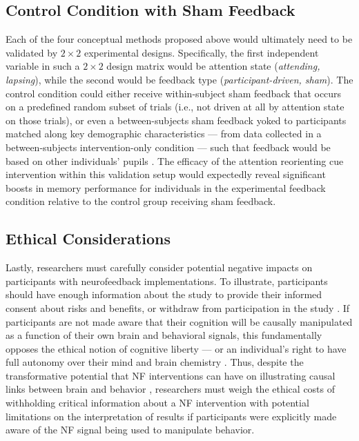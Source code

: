 \subsection{Control Condition with Sham Feedback}

Each of the four conceptual methods proposed above would ultimately need to be validated by $2 \times 2$ experimental designs. Specifically, the first independent variable in such a $2 \times 2$ design matrix would be attention state (\emph{attending, lapsing}), while the second would be feedback type (\emph{participant-driven, sham}). The control condition could either receive within-subject sham feedback that occurs on a predefined random subset of trials (i.e., not driven at all by attention state on those trials), or even a between-subjects sham feedback yoked to participants matched along key demographic characteristics --- from data collected in a between-subjects intervention-only condition --- such that feedback would be based on other individuals' pupils \parencite[similar to][]{debettencourt2015closed}. The efficacy of the attention reorienting cue intervention within this validation setup would expectedly reveal significant boosts in memory performance for individuals in the experimental feedback condition relative to the control group receiving sham feedback.

\subsection{Ethical Considerations}

Lastly, researchers must carefully consider potential negative impacts on participants with neurofeedback implementations. To illustrate, participants should have enough information about the study to provide their informed consent about risks and benefits, or withdraw from participation in the study \parencite{cherkaoui2021ethical}. If participants are not made aware that their cognition will be causally manipulated as a function of their own brain and behavioral signals, this fundamentally opposes the ethical notion of cognitive liberty --- or an individual's right to have full autonomy over their mind and brain chemistry \parencite{lavazza2018freedom,bublitz2013my,sententia2004neuroethical}. Thus, despite the transformative potential that NF interventions can have on illustrating causal links between brain and behavior \parencite{cherkaoui2021ethical}, researchers must weigh the ethical costs of withholding critical information about a NF intervention with potential limitations on the interpretation of results if participants were explicitly made aware of the NF signal being used to manipulate behavior.

